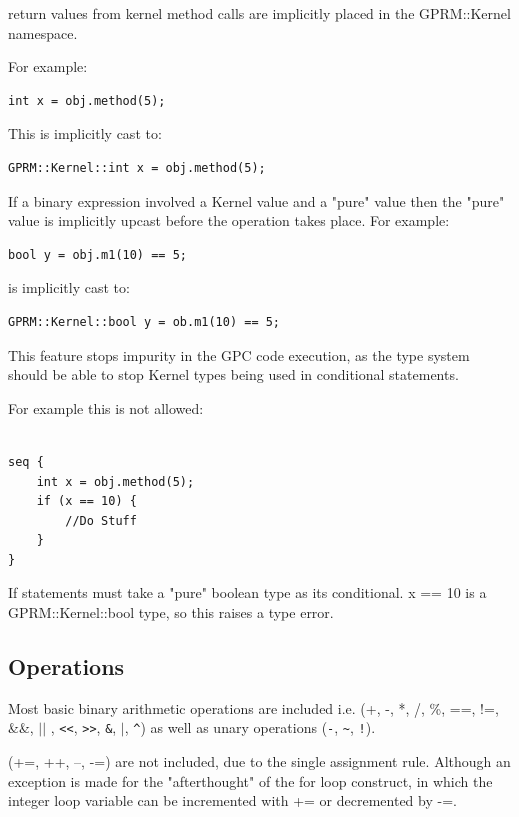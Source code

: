         return values from kernel method calls are implicitly placed
        in the GPRM::Kernel namespace. 

For example:

\begin{lstlisting}[style=myGPC]
int x = obj.method(5);
\end{lstlisting}

This is implicitly cast to:

\begin{lstlisting}[style=myGPC]
GPRM::Kernel::int x = obj.method(5);
\end{lstlisting}     

If a binary expression involved a Kernel value and a "pure" value
then the "pure" value is implicitly upcast before the operation takes
place. For example:

\begin{lstlisting}[style=myGPC]
bool y = obj.m1(10) == 5;    
\end{lstlisting}

is implicitly cast to:

\begin{lstlisting}[style=myGPC]
GPRM::Kernel::bool y = ob.m1(10) == 5;
\end{lstlisting}

This feature stops impurity in the GPC code execution, as the type system
should be able to stop Kernel types being used in conditional
statements. 

For example this is not allowed:
\begin{lstlisting}[style=myGPC]

seq {
    int x = obj.method(5);
    if (x == 10) {
        //Do Stuff
    }    
}

\end{lstlisting}

If statements must take a "pure" boolean type as its conditional.
x == 10 is a GPRM::Kernel::bool type, so this raises a type error.
  
\subsection{Operations}
        Most basic binary arithmetic operations are included i.e. 
        (+, -, *, /, \%, ==, !=, \&\&, $||$ , \lstinline|<<|, \lstinline|>>|, \lstinline|&|, $|$, 
        \lstinline|^|) as well as
        unary operations 
        (\lstinline|-|, \lstinline|~|, \lstinline|!|).

        (+=, ++, --, -=) are not included, due to the single assignment rule.
        Although an exception is made for the "afterthought" of the for loop construct, in which
        the integer loop variable can be incremented with += or decremented by -=.


